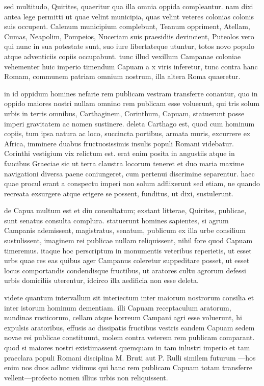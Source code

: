  sed multitudo, Quirites, quaeritur qua illa omnia oppida compleantur. nam dixi antea lege permitti ut quae velint municipia, quas velint veteres colonias colonis suis occupent. Calenum municipium complebunt, Teanum oppriment, Atellam, Cumas, Neapolim, Pompeios, Nuceriam suis praesidiis devincient, Puteolos vero qui nunc in sua potestate sunt, suo iure libertateque utuntur, totos novo populo atque adventiciis copiis occupabunt. tunc illud vexillum Campanae coloniae vehementer huic imperio timendum Capuam a x viris inferetur, tunc contra hanc Romam, communem patriam omnium nostrum, illa altera Roma quaeretur.

 in id oppidum homines nefarie rem publicam vestram transferre conantur, quo in oppido maiores nostri nullam omnino rem publicam esse voluerunt, qui tris solum urbis in terris omnibus, Carthaginem, Corinthum, Capuam, statuerunt posse imperi gravitatem ac nomen sustinere. deleta Carthago est, quod cum hominum copiis, tum ipsa natura ac loco, succincta portibus, armata muris, excurrere ex Africa, imminere duabus fructuosissimis insulis populi Romani videbatur. Corinthi vestigium vix relictum est. erat enim posita in angustiis atque in faucibus Graeciae sic ut terra claustra locorum teneret et duo maria maxime navigationi diversa paene coniungeret, cum pertenui discrimine separentur. haec quae procul erant a conspectu imperi non solum adflixerunt sed etiam, ne quando recreata exsurgere atque erigere se possent, funditus, ut dixi, sustulerunt.

 de Capua multum est et diu consultatum; exstant litterae, Quirites, publicae, sunt senatus consulta complura. statuerunt homines sapientes, si agrum Campanis ademissent, magistratus, senatum, publicum ex illa urbe consilium sustulissent, imaginem rei publicae nullam reliquissent, nihil fore quod Capuam timeremus. itaque hoc perscriptum in monumentis veteribus reperietis, ut esset urbs quae res eas quibus ager Campanus coleretur suppeditare posset, ut esset locus comportandis condendisque fructibus, ut aratores cultu agrorum defessi urbis domiciliis uterentur, idcirco illa aedificia non esse deleta.

 videte quantum intervallum sit interiectum inter maiorum nostrorum consilia et inter istorum hominum dementiam. illi Capuam receptaculum aratorum, nundinas rusticorum, cellam atque horreum Campani agri esse voluerunt, hi expulsis aratoribus, effusis ac dissipatis fructibus vestris eandem Capuam sedem novae rei publicae constituunt, molem contra veterem rem publicam comparant. quod si maiores nostri existimassent quemquam in tam inlustri imperio et tam praeclara populi Romani disciplina M. Bruti aut P. Rulli similem futurum —hos enim nos duos adhuc vidimus qui hanc rem publicam Capuam totam transferre vellent—profecto nomen illius urbis non reliquissent.

